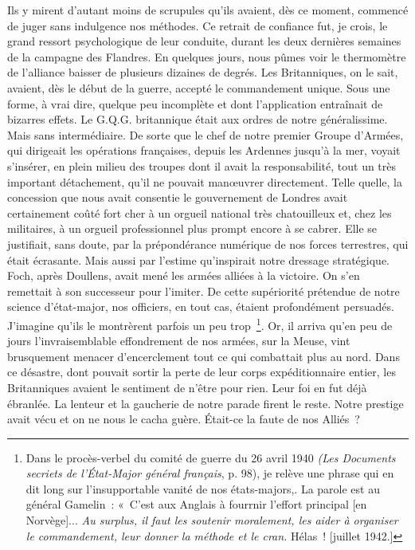 \documentclass[french,twoside]{book} %
\begin{document}
Ils y mirent d’autant moins de scrupules qu’ils avaient, dès ce moment, commencé de juger sans indulgence nos méthodes. Ce retrait de confiance fut, je crois, le grand ressort psychologique de leur conduite, durant les deux dernières semaines de la campagne des Flandres. En quelques jours, nous pûmes voir le thermomètre de l’alliance baisser de   plusieurs dizaines de degrés. Les Britanniques, on le sait, avaient, dès le début de la guerre, accepté le commandement unique. Sous une forme, à vrai dire, quelque peu incomplète et dont l’application entraînait de bizarres effets. Le G.Q.G. britannique était aux ordres de notre généralissime. Mais sans intermédiaire. De sorte que le chef de notre premier Groupe d’Armées, qui dirigeait les opérations françaises, depuis les Ardennes jusqu’à la mer, voyait s’insérer, en plein milieu des troupes dont il avait la responsabilité, tout un très important détachement, qu’il ne pouvait manœuvrer directement. Telle quelle, la concession que nous avait consentie le gouvernement de Londres avait certainement coûté fort cher à un orgueil national très chatouilleux et, chez les militaires, à un orgueil professionnel plus prompt encore à se cabrer. Elle se justifiait, sans doute, par la prépondérance numérique de nos forces terrestres, qui était écrasante. Mais aussi par l’estime qu’inspirait notre dressage stratégique. Foch, après Doullens, avait mené les armées alliées à la victoire. On s’en remettait à son successeur pour l’imiter. De cette supériorité prétendue de notre science d’état-major, nos officiers, en tout cas, étaient profondément persuadés. J’imagine qu’ils le montrèrent parfois un peu trop \footnote{ Dans le procès-verbel du comité de guerre du 26 avril 1940 {\itshape (Les Documents secriets de l’État-Major général français}, p. 98), je relève une phrase qui en dit long sur l’insupportable vanité de nos états-majors,. La parole est au général Gamelin : « C’est aux Anglais à fourrnir l’effort principal [en Norvège]... {\itshape Au surplus, il faut les soutenir moralement, les aider à organiser le commandement, leur donner la méthode et le cran.} Hélas ! [juillet 1942.]}. Or, il arriva qu’en peu de jours l’invraisemblable effondrement de nos armées, sur la Meuse, vint brusquement menacer d’encerclement tout ce qui combattait plus au nord. Dans ce désastre, dont pouvait sortir la perte de leur corps   expéditionnaire entier, les Britanniques avaient le sentiment de n’être pour rien. Leur foi en fut déjà ébranlée. La lenteur et la gaucherie de notre parade firent le reste. Notre prestige avait vécu et on ne nous le cacha guère. Était-ce la faute de nos Alliés ?\par
\end{document}
